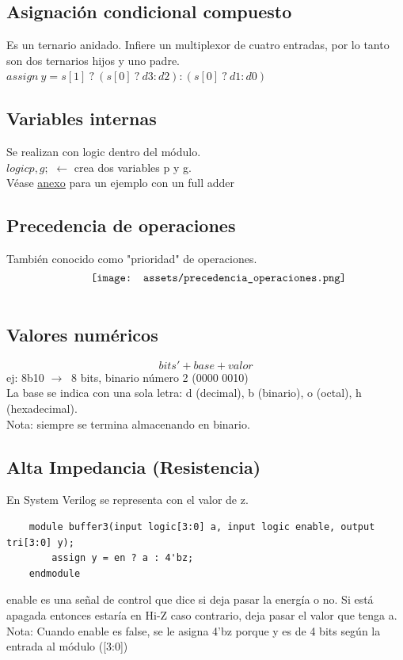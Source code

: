 \documentclass[10pt,a4paper]{article}
\begin{document}
\subsection*{Asignación condicional compuesto}
Es un ternario anidado. Infiere un multiplexor de cuatro entradas, por lo tanto son dos ternarios hijos y uno padre.
$ assign \ y = s[1] \ ? \ (s[0] \ ? \ d3 : d2) : (s[0] \ ? \ d1 : d0)$
\subsection*{Variables internas}
Se realizan con logic dentro del módulo. \\
$logic p, g;$ $ \leftarrow  $ crea dos variables p y g. \\
Véase \hyperref[subsec:SVL_FullAdder]{\underline{anexo}} para un ejemplo con un full adder

\subsection*{Precedencia de operaciones}
También conocido como "prioridad" de operaciones.
\[\begin{minipage}[b]{0.6\textwidth}
    \texttt{[image: assets/precedencia\_operaciones.png]}
    \label{fig:precedencia_operaciones}
\end{minipage}\]
\subsection*{Valores numéricos}
\[bits' + base + valor\]
ej: 8b10 $ \rightarrow \ $ 8 bits, binario número 2 (0000 0010) \\ 
La base se indica con una sola letra: d (decimal), b (binario), o (octal), h (hexadecimal). \\
Nota: siempre se termina almacenando en binario. 
\subsection*{Alta Impedancia (Resistencia)}
En System Verilog se representa con el valor de z. \\
\begin{lstlisting}
    module buffer3(input logic[3:0] a, input logic enable, output tri[3:0] y);
        assign y = en ? a : 4'bz;
    endmodule
\end{lstlisting}
enable es una señal de control que dice si deja pasar la energía o no. Si está apagada entonces estaría en Hi-Z caso contrario, deja pasar el valor que tenga a. \\ 
Nota: Cuando enable es false, se le asigna 4'bz porque y es de 4 bits según la entrada al módulo ([3:0])
\end{document}
